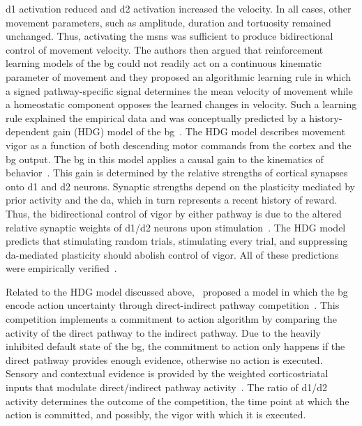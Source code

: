 \gls{d1} activation reduced and \gls{d2} activation increased the velocity.
In all cases, other movement parameters, such as amplitude, duration and tortuosity remained unchanged.
Thus, activating the \glspl{msn} was sufficient to produce bidirectional control of movement velocity.
The authors then argued that reinforcement learning models of the \gls{bg} could not readily act on a continuous kinematic parameter of movement and they proposed an algorithmic learning rule in which a signed pathway-specific signal determines the mean velocity of movement while a homeostatic component opposes the learned changes in velocity.
Such a learning rule explained the empirical data and was conceptually predicted by a history-dependent gain (HDG) model of the \gls{bg}~\cite{Yttri2016Nature, Yttri2018MovDisorder}.
The HDG model describes movement vigor as a function of both descending motor commands from the cortex and the \gls{bg} output.
The \gls{bg} in this model applies a causal gain to the kinematics of behavior~\cite{Yttri2018MovDisorder}.
This gain is determined by the relative strengths of cortical synapses onto \gls{d1} and \gls{d2} neurons.
Synaptic strengths depend on the plasticity mediated by prior activity and the \gls{da}, which in turn represents a recent history of reward.
Thus, the bidirectional control of vigor by either pathway is due to the altered relative synaptic weights of \gls{d1}/\gls{d2} neurons upon stimulation~\cite{Yttri2016Nature}.
The HDG model predicts that stimulating random trials, stimulating every trial, and suppressing \gls{da}-mediated plasticity should abolish control of vigor.
All of these predictions were empirically verified~\cite{Yttri2016Nature}.
\par
Related to the HDG model discussed above,~\citeauthor{Dunovan2016FrontNeurosci} proposed a model in which the \gls{bg} encode action uncertainty through direct-indirect pathway competition~\cite{Dunovan2016FrontNeurosci}.
This competition implements a commitment to action algorithm by comparing the activity of the direct pathway to the indirect pathway.
Due to the heavily inhibited default state of the \gls{bg}, the commitment to action only happens if the direct pathway provides enough evidence, otherwise no action is executed.
Sensory and contextual evidence is provided by the weighted corticostriatal inputs that modulate direct/indirect pathway activity~\cite{Dunovan2016FrontNeurosci}.
The ratio of \gls{d1}/\gls{d2} activity determines the outcome of the competition, the time point at which the action is committed, and possibly, the vigor with which it is executed.